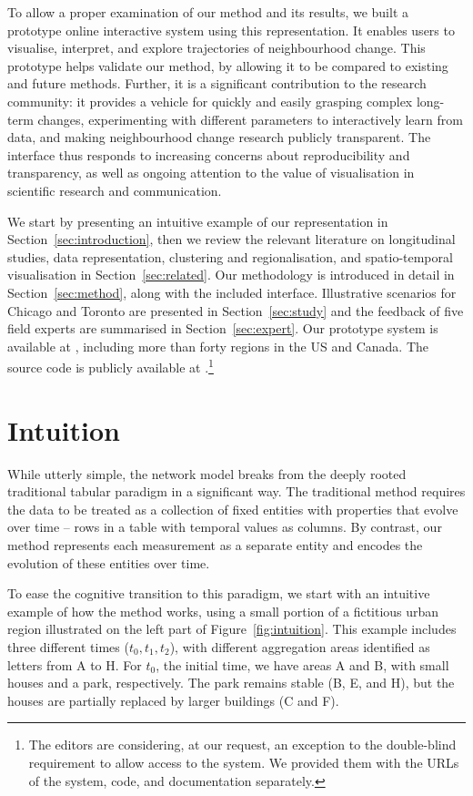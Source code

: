 To allow a proper examination of our method and its results, we built a prototype online
interactive system using this representation. It enables users to visualise,
interpret, and explore trajectories of neighbourhood change. This prototype
helps validate our method, by allowing it to be compared to existing and future
methods. Further, it is a significant contribution to the research community: it
provides a vehicle for quickly and easily grasping complex long-term changes,
experimenting with different parameters to interactively learn from data, and
making neighbourhood change research publicly transparent. The interface thus
responds to increasing concerns about reproducibility and transparency, as well
as ongoing attention to the value of visualisation in scientific research and
communication.


We start by presenting an intuitive example of our representation in
Section~\ref{sec:introduction}, then we review the relevant literature on
longitudinal studies, data representation, clustering and regionalisation, and
spatio-temporal visualisation in Section~\ref{sec:related}. Our methodology is
introduced in detail in Section~\ref{sec:method}, along with the included
interface. Illustrative scenarios for Chicago and Toronto are presented in
Section~\ref{sec:study} and the feedback of five field experts are summarised in
Section~\ref{sec:expert}. Our prototype system is available at
, including more than forty regions in the
US and Canada. The source code is publicly available at
.\footnote{The editors are
considering, at our request, an exception to the double-blind requirement to
allow access to the system. We provided them with the URLs of the system, code,
and documentation separately.}


\section{Intuition}
\label{sec:intuition}
While utterly simple, the network model breaks from the deeply rooted
traditional tabular paradigm in a significant way. The traditional method
requires the data to be treated as a collection of fixed entities with
properties that evolve over time -- rows in a table with temporal values as
columns. By contrast, our method represents each measurement as a separate
entity and encodes the evolution of these entities over time.

To ease the cognitive transition to this paradigm, we start with an intuitive
example of how the method works, using a small portion of a fictitious urban
region illustrated on the left part of Figure~\ref{fig:intuition}. This example
includes three different times ($t_0,t_1,t_2$), with different aggregation areas
identified as letters from A to H. For $t_0$, the initial time, we have areas A
and B, with small houses and a park, respectively. The park remains stable (B,
E, and H), but the houses are partially replaced by larger buildings (C and F). 

